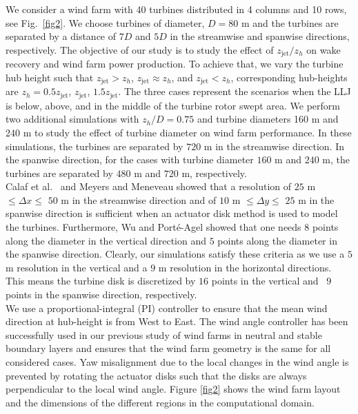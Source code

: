 \documentclass[%
 aip,
 amsmath,amssymb,
reprint,
twocolumn,%
author-numerical,%
]{revtex4-1}
\begin{document}
{\color{black} \indent We consider a wind farm with 40 turbines distributed in 4 columns and 10 rows, see Fig.\ \ref{fig2}. We choose turbines of diameter, $D=80$ m and the turbines are separated by a distance of $7D$ and $5D$ in the streamwise and spanwise directions, respectively. The objective of our study is to study the effect of $z_\text{jet}/z_h$ on wake recovery and wind farm power production. To achieve that, we vary the turbine hub height such that $z_\text{jet}>z_h$, $z_\text{jet}{\approx}z_h$, and $z_{\text{jet}} < z_h$, corresponding hub-heights are $z_h=0.5z_\text{jet}$, $z_\text{jet}$, $1.5z_\text{jet}$. The three cases represent the scenarios when the LLJ is below, above, and in the middle of the turbine rotor swept area. We perform two additional simulations with $z_h/D=0.75$ and turbine diameters 160 m and 240 m to study the effect of turbine diameter on wind farm performance. In these simulations, the turbines are separated by $720$ m in the streamwise direction. In the spanwise direction, for the cases with turbine diameter $160$ m and $240$ m, the turbines are separated by $480$ m and $720$ m, respectively.}\\
\indent Calaf et al.\ \cite{cal10} and Meyers and Meneveau \cite{mey13} showed that a resolution of $25$ m $\leq \Delta{x} \leq$ $50$ m in the streamwise direction and of $10$ m $\leq \Delta{y}\leq$ $25$ m in the spanwise direction is sufficient when an actuator disk method is used to model the turbines. Furthermore, Wu and Port\'e-Agel \cite{wu11} showed that one needs $8$ points along the diameter in the vertical direction and $5$ points along the diameter in the spanwise direction. Clearly, our simulations satisfy these criteria as we use a $5$ m resolution in the vertical and a $9$ m resolution in the horizontal directions. This means the turbine disk is discretized by $16$ points in the vertical and \ $9$ points in the spanwise direction, respectively.\\
\indent We use a proportional-integral (PI) controller\cite{all15} to ensure that the mean wind direction at hub-height is from West to East. The wind angle controller has been successfully used in our previous study of wind farms in neutral and stable boundary layers \cite{nag19} and ensures that the wind farm geometry is the same for all considered cases. Yaw misalignment due to the local changes in the wind angle is prevented by rotating the actuator disks such that the disks are always perpendicular to the local wind angle. Figure \ref{fig2} shows the wind farm layout and the dimensions of the different regions in the computational domain.
\end{document}
